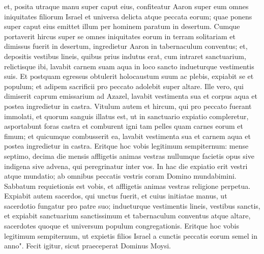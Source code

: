 \begin{biblechapter}
\verse et, posita utraque manu super caput eius, confiteatur Aaron super eum omnes iniquitates filiorum Israel et universa delicta atque peccata eorum; quae ponens super caput eius emittet illum per hominem paratum in desertum. 
\verse Cumque portaverit hircus super se omnes iniquitates eorum in terram solitariam et dimissus fuerit in desertum, 
\verse ingredietur Aaron in tabernaculum conventus; et, depositis vestibus lineis, quibus prius indutus erat, cum intraret sanctuarium, relictisque ibi, 
\verse lavabit carnem suam aqua in loco sancto indueturque vestimentis suis. Et postquam egressus obtulerit holocaustum suum ac plebis, expiabit se et populum; 
\verse et adipem sacrificii pro peccato adolebit super altare. 
\verse Ille vero, qui dimiserit caprum emissarium ad Azazel, lavabit vestimenta sua et corpus aqua et postea ingredietur in castra. 
\verse Vitulum autem et hircum, qui pro peccato fuerant immolati, et quorum sanguis illatus est, ut in sanctuario expiatio compleretur, asportabunt foras castra et comburent igni tam pelles quam carnes eorum et fimum; 
\verse et quicumque combusserit ea, lavabit vestimenta sua et carnem aqua et postea ingredietur in castra. 
\verse Eritque hoc vobis legitimum sempiternum: mense septimo, decima die mensis affligetis animas vestras nullumque facietis opus sive indigena sive advena, qui peregrinatur inter vos. 
\verse In hac die expiatio erit vestri atque mundatio; ab omnibus peccatis vestris coram Domino mundabimini. 
\verse Sabbatum requietionis est vobis, et affligetis animas vestras religione perpetua. 
\verse Expiabit autem sacerdos, qui unctus fuerit, et cuius initiatae manus, ut sacerdotio fungatur pro patre suo; indueturque vestimentis lineis, vestibus sanctis, 
\verse et expiabit sanctuarium sanctissimum et tabernaculum conventus atque altare, sacerdotes quoque et universum populum congregationis. 
\verse Eritque hoc vobis legitimum sempiternum, ut expietis filios Israel a cunctis peccatis eorum semel in anno". Fecit igitur, sicut praeceperat Dominus Moysi. 
\end{biblechapter}


